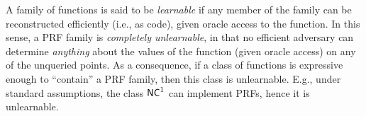\documentclass[11pt]{article}
\begin{document}
A family of functions is said to be \emph{learnable} if any member of
the family can be reconstructed efficiently (i.e., as code), given
oracle access to the function.  In this sense, a PRF family is
\emph{completely unlearnable}, in that no efficient adversary can
determine \emph{anything} about the values of the function (given
oracle access) on any of the unqueried points.  As a consequence, if a
class of functions is expressive enough to ``contain'' a PRF family,
then this class is unlearnable.  E.g., under standard assumptions, the
class $\mathsf{NC}^{1}$ can implement PRFs, hence it is unlearnable.
\end{document}

